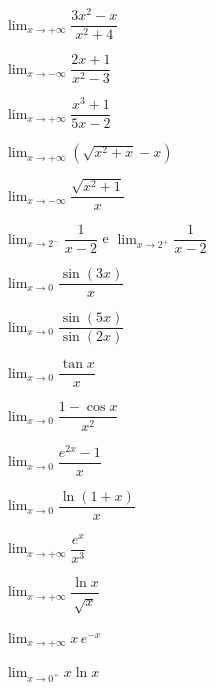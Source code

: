 \documentclass[12pt]{article}
\begin{document}
\begin{exercicios}
  \item $\displaystyle\lim_{x \to +\infty} \dfrac{3x^2 - x}{x^2 + 4}$
  \item $\displaystyle\lim_{x \to -\infty} \dfrac{2x + 1}{x^2 - 3}$
  \item $\displaystyle\lim_{x \to +\infty} \dfrac{x^3 + 1}{5x - 2}$
  \item $\displaystyle\lim_{x \to +\infty} \left(\sqrt{x^2 + x} - x\right)$
  \item $\displaystyle\lim_{x \to -\infty} \dfrac{\sqrt{x^2 + 1}}{x}$
  \item $\displaystyle\lim_{x \to 2^-} \dfrac{1}{x - 2}$ \; e \; $\displaystyle\lim_{x \to 2^+} \dfrac{1}{x - 2}$
\end{exercicios}

\begin{exercicios}
  \item $\displaystyle\lim_{x \to 0} \dfrac{\sin(3x)}{x}$
  \item $\displaystyle\lim_{x \to 0} \dfrac{\sin(5x)}{\sin(2x)}$
  \item $\displaystyle\lim_{x \to 0} \dfrac{\tan x}{x}$
  \item $\displaystyle\lim_{x \to 0} \dfrac{1 - \cos x}{x^2}$
  \item $\displaystyle\lim_{x \to 0} \dfrac{e^{2x} - 1}{x}$
  \item $\displaystyle\lim_{x \to 0} \dfrac{\ln(1 + x)}{x}$
  \item $\displaystyle\lim_{x \to +\infty} \dfrac{e^x}{x^3}$
  \item $\displaystyle\lim_{x \to +\infty} \dfrac{\ln x}{\sqrt{x}}$
  \item $\displaystyle\lim_{x \to +\infty} x\,e^{-x}$
  \item $\displaystyle\lim_{x \to 0^+} x \ln x$
\end{exercicios}
\end{document}
